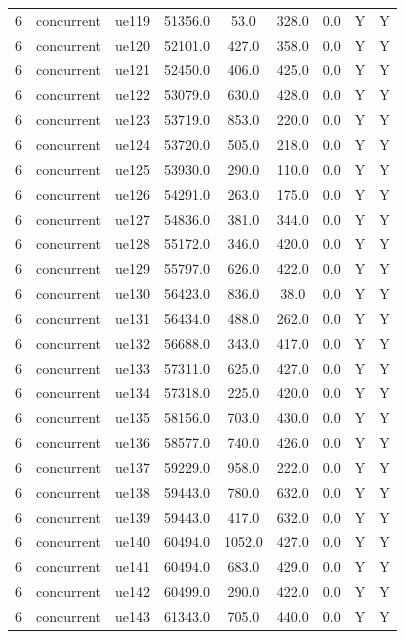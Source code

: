 \begin{table}[ht]
\begin{tabular}{|c|c|c|c|c|c|c|c|c|}
6 & concurrent & ue119 & 51356.0 & 53.0 & 328.0 & 0.0 & Y & Y \\
6 & concurrent & ue120 & 52101.0 & 427.0 & 358.0 & 0.0 & Y & Y \\
6 & concurrent & ue121 & 52450.0 & 406.0 & 425.0 & 0.0 & Y & Y \\
6 & concurrent & ue122 & 53079.0 & 630.0 & 428.0 & 0.0 & Y & Y \\
6 & concurrent & ue123 & 53719.0 & 853.0 & 220.0 & 0.0 & Y & Y \\
6 & concurrent & ue124 & 53720.0 & 505.0 & 218.0 & 0.0 & Y & Y \\
6 & concurrent & ue125 & 53930.0 & 290.0 & 110.0 & 0.0 & Y & Y \\
6 & concurrent & ue126 & 54291.0 & 263.0 & 175.0 & 0.0 & Y & Y \\
6 & concurrent & ue127 & 54836.0 & 381.0 & 344.0 & 0.0 & Y & Y \\
6 & concurrent & ue128 & 55172.0 & 346.0 & 420.0 & 0.0 & Y & Y \\
6 & concurrent & ue129 & 55797.0 & 626.0 & 422.0 & 0.0 & Y & Y \\
6 & concurrent & ue130 & 56423.0 & 836.0 & 38.0 & 0.0 & Y & Y \\
6 & concurrent & ue131 & 56434.0 & 488.0 & 262.0 & 0.0 & Y & Y \\
6 & concurrent & ue132 & 56688.0 & 343.0 & 417.0 & 0.0 & Y & Y \\
6 & concurrent & ue133 & 57311.0 & 625.0 & 427.0 & 0.0 & Y & Y \\
6 & concurrent & ue134 & 57318.0 & 225.0 & 420.0 & 0.0 & Y & Y \\
6 & concurrent & ue135 & 58156.0 & 703.0 & 430.0 & 0.0 & Y & Y \\
6 & concurrent & ue136 & 58577.0 & 740.0 & 426.0 & 0.0 & Y & Y \\
6 & concurrent & ue137 & 59229.0 & 958.0 & 222.0 & 0.0 & Y & Y \\
6 & concurrent & ue138 & 59443.0 & 780.0 & 632.0 & 0.0 & Y & Y \\
6 & concurrent & ue139 & 59443.0 & 417.0 & 632.0 & 0.0 & Y & Y \\
6 & concurrent & ue140 & 60494.0 & 1052.0 & 427.0 & 0.0 & Y & Y \\
6 & concurrent & ue141 & 60494.0 & 683.0 & 429.0 & 0.0 & Y & Y \\
6 & concurrent & ue142 & 60499.0 & 290.0 & 422.0 & 0.0 & Y & Y \\
6 & concurrent & ue143 & 61343.0 & 705.0 & 440.0 & 0.0 & Y & Y \\

\end{tabular}
\end{table}
